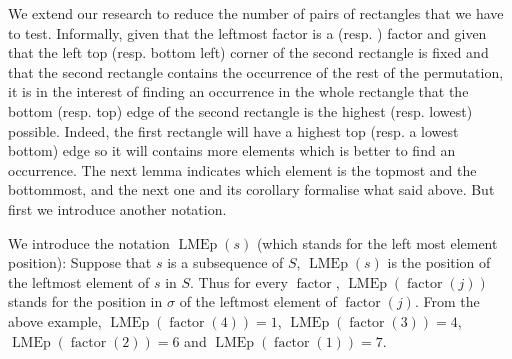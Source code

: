 \documentclass[a4paper]{llncs}
\newcommand{\RLMin}{\text{RLMin}\xspace}
\newcommand{\RLMax}{\text{RLMax}\xspace}
\newcounter{num}
\DeclareMathOperator{\LMEi}{LMEp}
\DeclareMathOperator{\factor}{factor}
\begin{document}
We extend our research to reduce the number of pairs of rectangles
that we have to test.
Informally,
given that the leftmost factor is a \RLMin (resp. \RLMax) factor and
given that the left top (resp. bottom left) corner of the second rectangle is fixed and
that the second rectangle contains the occurrence of the
rest of the permutation, it is in the interest of finding an occurrence in the whole rectangle
that the bottom (resp. top) edge of the second rectangle is the highest (resp. lowest) possible.
Indeed, the first rectangle will have
a highest top (resp. a lowest bottom) edge so it will contains more elements
which is better to find an occurrence.
The next lemma indicates which element is the topmost and the bottommost,
and the next one and its corollary formalise what said above.
But first we introduce another notation.

We introduce the notation $\LMEi(s)$ (which stands for the left most element position): Suppose that $s$ is a subsequence of $S$, $\LMEi(s)$ is the position of the leftmost element of $s$ in $S$. Thus
for every $\factor$, $\LMEi(\factor(j))$ stands for the position in $\sigma$
of the leftmost element of $\factor(j)$.
From the above example,
$\LMEi(\factor(4)) = 1$, $\LMEi(\factor(3)) = 4$, $\LMEi(\factor(2)) = 6$ and $\LMEi(\factor(1)) = 7$.

%

%
%
%
\end{document}
